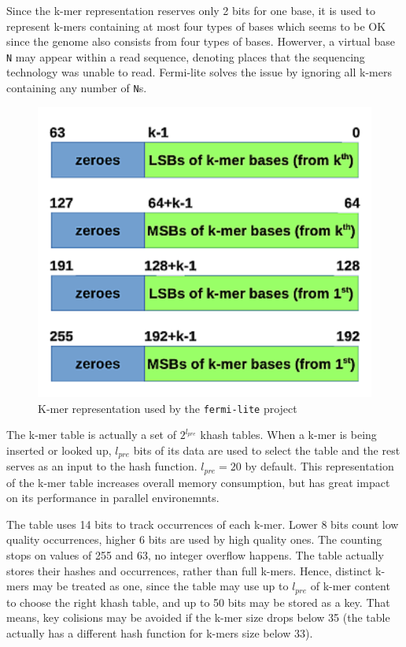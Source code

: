 Since the k-mer representation reserves only 2 bits for one base, it is used to represent k-mers containing at most four types of bases which seems to be OK since the genome also consists from four types of bases. Howerver, a virtual base \texttt{N} may appear within a read sequence, denoting places that the sequencing technology was unable to read. Fermi-lite solves the issue by ignoring all k-mers containing any number of \texttt{N}s.

\begin{figure}[h]
	\centering
	\includegraphics{img/fermi-kmer-structure.pdf}
	\caption{K-mer representation used by the \texttt{fermi-lite} project}
	\label{fig:fermi-kmer-structure}
\end{figure}

The k-mer table is actually a set of $2^{l_{pre}}$ khash tables. When a k-mer is being inserted or looked up, $l_{pre}$ bits of its data are used to select the table and the rest serves as an input to the hash function. $l_{pre} = 20$ by default. This representation of the k-mer table increases overall memory consumption, but has great impact on its performance in parallel environemnts. 

The table uses 14 bits to track occurrences of each k-mer. Lower 8 bits count low quality occurrences, higher 6 bits are used by high quality ones. The counting stops on values of 255 and 63, no integer overflow happens. The table actually stores their hashes and occurrences, rather than full k-mers. Hence, distinct k-mers may be treated as one, since the table may use up to $l_{pre}$ of k-mer content to choose the right khash table, and up to 50 bits may be stored as a key. That means, key colisions may be avoided if the k-mer size drops below 35 (the table actually has a different hash function for k-mers size below 33).

